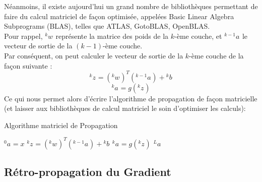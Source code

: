 \documentclass[10pt,a4paper]{report}
\newcommand{\lexp}[1]{\phantom{}^{#1}}
\newcommand{\elem}[4]{\lexp{#2}#1^{#3}_{#4}}
\begin{document}
			Néanmoins, il existe aujourd'hui un grand nombre de bibliothèques permettant de faire du calcul matriciel de façon optimisée, appelées Basic Linear Algebra Subprograms (BLAS), telles que ATLAS, GotoBLAS, OpenBLAS.\\
			Pour rappel, $\elem{w}{k}{}{}$ représente la matrice des poids de la $k$-ème couche, et $\elem{a}{k-1}{}{}$ le vecteur de sortie de la $(k-1)$-ème couche.\\
			Par conséquent, on peut calculer le vecteur de sortie de la $k$-ème couche de la façon suivante :
			$$\elem{z}{k}{}{} = (\elem{w}{k}{}{})^T(\elem{a}{k-1}{}{}) + \elem{b}{k}{}{}$$
			$$\elem{a}{k}{}{} = g(\elem{z}{k}{}{})$$
			Ce qui nous permet alors d'écrire l'algorithme de propagation de façon matricielle (et laisser aux bibliothèques de calcul matriciel le soin d'optimiser les calculs):
			\begin{algorithm}[H]
				\caption{Algorithme matriciel de Propagation}
				\begin{algorithmic}
				    \STATE $\elem{a}{0}{}{} = x$
				    	\STATE $\elem{z}{k}{}{} = (\elem{w}{k}{}{})^T(\elem{a}{k-1}{}{}) + \elem{b}{k}{}{}$
				    	\STATE $\elem{a}{k}{}{} = g(\elem{z}{k}{}{})$
				    \ENDFOR
				    \RETURN $\elem{a}{L}{}{}$
				\end{algorithmic}
			\end{algorithm}
			
		\subsection{Rétro-propagation du Gradient}
		
\end{document}
